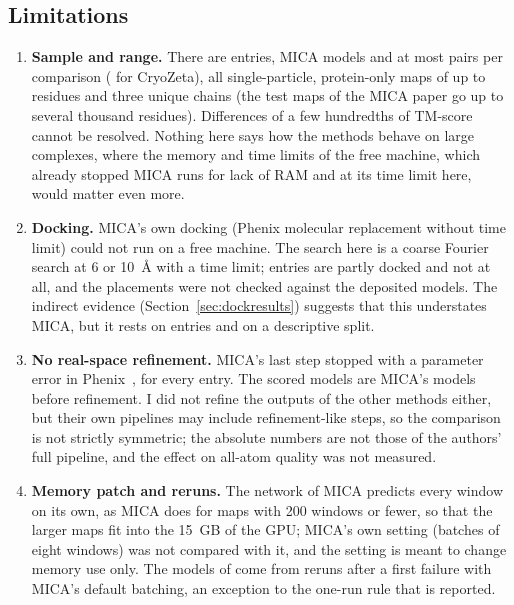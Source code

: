 \subsection{Limitations}
\begin{enumerate}
\item \textbf{Sample and range.} There are \NEntries{} entries, \NModelMica{} MICA models and at most \NPairsTmAngelo{} pairs per comparison (\NPairsTmCryozeta{} for CryoZeta), all single-particle, protein-only maps of up to \ResiduesMax{} residues and three unique chains (the test maps of the MICA paper go up to several thousand residues). Differences of a few hundredths of TM-score cannot be resolved. Nothing here says how the methods behave on large complexes, where the memory and time limits of the free machine, which already stopped \FailKillMica{} MICA runs for lack of RAM and \FailTimeoutMica{} at its time limit here, would matter even more.
\item \textbf{Docking.} MICA's own docking (Phenix molecular replacement without time limit) could not run on a free machine. The search here is a coarse Fourier search at 6 or 10~\AA{} with a time limit; \DockModePartial{} entries are partly docked and \DockModeNone{} not at all, and the placements were not checked against the deposited models. The indirect evidence (Section~\ref{sec:dockresults}) suggests that this understates MICA, but it rests on \DockEffectN{} entries and on a descriptive split.
\item \textbf{No real-space refinement.} MICA's last step stopped with a parameter error in Phenix~\PhenixVersion{}, for every entry. The scored models are MICA's models before refinement. I did not refine the outputs of the other methods either, but their own pipelines may include refinement-like steps, so the comparison is not strictly symmetric; the absolute numbers are not those of the authors' full pipeline, and the effect on all-atom quality was not measured.
\item \textbf{Memory patch and reruns.} The network of MICA predicts every window on its own, as MICA does for maps with 200 windows or fewer, so that the larger maps fit into the 15~GB of the GPU; MICA's own setting (batches of eight windows) was not compared with it, and the setting is meant to change memory use only. The \NRerunMica{} models of \RerunMicaList{} come from reruns after a first failure with MICA's default batching, an exception to the one-run rule that is reported.

\end{enumerate}
